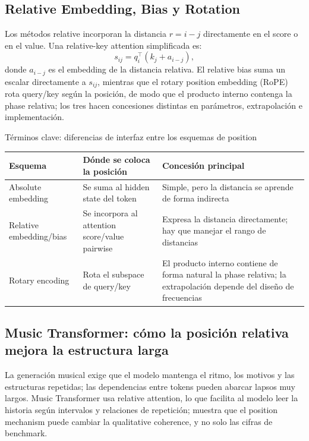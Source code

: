 \subsection{Relative Embedding, Bias y Rotation}

Los métodos relative incorporan la distancia $r=i-j$ directamente en el score o en el value. Una relative-key attention simplificada es:
\[
s_{ij}=q_i^\top(k_j+a_{i-j}),
\]
donde $a_{i-j}$ es el embedding de la distancia relativa. El relative bias suma un escalar directamente a $s_{ij}$, mientras que el rotary position embedding (RoPE) rota query/key según la posición, de modo que el producto interno contenga la phase relativa; los tres hacen concesiones distintas en parámetros, extrapolación e implementación.


\begin{knowledgebox}{Términos clave: diferencias de interfaz entre los esquemas de position}
\begin{tabularx}{\textwidth}{@{}L{0.20\textwidth}X X@{}}
\toprule
Esquema & Dónde se coloca la posición & Concesión principal \\
\midrule
Absolute embedding & Se suma al hidden state del token & Simple, pero la distancia se aprende de forma indirecta \\
Relative embedding/bias & Se incorpora al attention score/value pairwise & Expresa la distancia directamente; hay que manejar el rango de distancias \\
Rotary encoding & Rota el subspace de query/key & El producto interno contiene de forma natural la phase relativa; la extrapolación depende del diseño de frecuencias \\
\bottomrule
\end{tabularx}
\end{knowledgebox}

\subsection{Music Transformer: cómo la posición relativa mejora la estructura larga}

La generación musical exige que el modelo mantenga el ritmo, los motivos y las estructuras repetidas; las dependencias entre tokens pueden abarcar lapsos muy largos. Music Transformer usa relative attention, lo que facilita al modelo leer la historia según intervalos y relaciones de repetición; muestra que el position mechanism puede cambiar la qualitative coherence, y no solo las cifras de benchmark.

